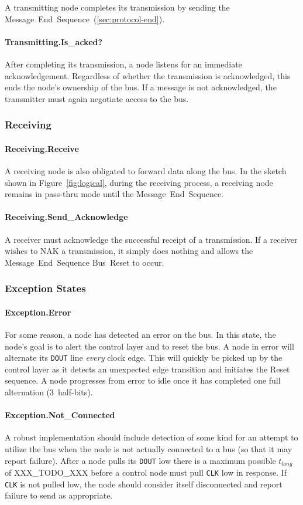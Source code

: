 A transmitting node completes its transmission by sending the
Message~End~Sequence~(\ref{sec:protocol-end}).

\paragraph{Transmitting.{\sc Is\_acked?}}
After completing its transmission, a node listens for an immediate
acknowledgement. Regardless of whether the transmission is acknowledged, this
ends the node's ownership of the bus. If a message is not acknowledged, the
transmitter must again negotiate access to the bus.

\subsubsection{Receiving}

\paragraph{Receiving.{\sc Receive}}
A receiving node is also obligated to forward data along the bus. In the
sketch shown in Figure~\ref{fig:logical}, during the receiving process, a
receiving node remains in pass-thru mode until the Message~End~Sequence.

\paragraph{Receiving.{\sc Send\_Acknowledge}}
A receiver must acknowledge the successful receipt of a transmission. If a
receiver wishes to NAK a transmission, it simply does nothing and allows the
Message~End~Sequence Bus~Reset to occur.

\subsubsection{Exception States}

\paragraph{Exception.{\sc Error}}
For some reason, a node has detected an error on the bus. In this state, the
node's goal is to alert the control layer and to reset the bus. A node in {\sc
error} will alternate its {\tt DOUT} line {\em every} clock edge. This will
quickly be picked up by the control layer as it detects an unexpected edge
transition and initiates the Reset sequence. A node progresses from {\sc error}
to {\sc idle} once it has completed one full alternation (3~half-bits).

\paragraph{Exception.{\sc Not\_Connected}}
A robust implementation should include detection of some kind for an attempt
to utilize the bus when the node is not actually connected to a bus (so that
it may report failure). After a node pulls its {\tt DOUT} low there is a
maximum possible $t_{long}$ of XXX\_TODO\_XXX before a control node must pull
{\tt CLK} low in response. If {\tt CLK} is not pulled low, the node should
consider itself disconnected and report failure to send as appropriate.
